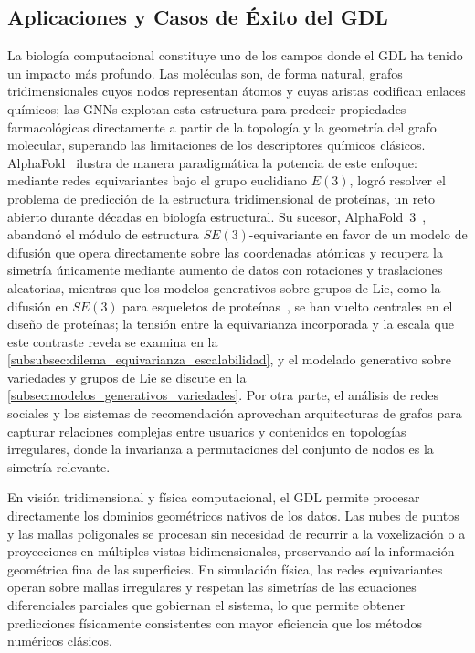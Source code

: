 \subsection{Aplicaciones y Casos de Éxito del GDL}\label{subsec:casos_exito_gdl}

La biología computacional constituye uno de los campos donde el \gls{GDL} ha tenido un impacto más profundo. Las moléculas son, de forma natural, grafos tridimensionales cuyos nodos representan átomos y cuyas aristas codifican enlaces químicos; las \glspl{GNN} explotan esta estructura para predecir propiedades farmacológicas directamente a partir de la topología y la geometría del grafo molecular, superando las limitaciones de los descriptores químicos clásicos. AlphaFold~\citep{jumper2021alphafold} ilustra de manera paradigmática la potencia de este enfoque: mediante redes equivariantes bajo el grupo euclidiano $E(3)$, logró resolver el problema de predicción de la estructura tridimensional de proteínas, un reto abierto durante décadas en biología estructural. Su sucesor, AlphaFold~3~\citep{abramson2024alphafold3}, abandonó el módulo de estructura $SE(3)$-equivariante en favor de un modelo de difusión que opera directamente sobre las coordenadas atómicas y recupera la simetría únicamente mediante aumento de datos con rotaciones y traslaciones aleatorias, mientras que los modelos generativos sobre grupos de Lie, como la difusión en $SE(3)$ para esqueletos de proteínas~\citep{yim2023se3diffusion}, se han vuelto centrales en el diseño de proteínas; la tensión entre la equivarianza incorporada y la escala que este contraste revela se examina en la \autoref{subsubsec:dilema_equivarianza_escalabilidad}, y el modelado generativo sobre variedades y grupos de Lie se discute en la \autoref{subsec:modelos_generativos_variedades}. Por otra parte, el análisis de redes sociales y los sistemas de recomendación aprovechan arquitecturas de grafos para capturar relaciones complejas entre usuarios y contenidos en topologías irregulares, donde la invarianza a permutaciones del conjunto de nodos es la simetría relevante.

En visión tridimensional y física computacional, el \gls{GDL} permite procesar directamente los dominios geométricos nativos de los datos. Las nubes de puntos y las mallas poligonales se procesan sin necesidad de recurrir a la voxelización o a proyecciones en múltiples vistas bidimensionales, preservando así la información geométrica fina de las superficies. En simulación física, las redes equivariantes operan sobre mallas irregulares y respetan las simetrías de las ecuaciones diferenciales parciales que gobiernan el sistema, lo que permite obtener predicciones físicamente consistentes con mayor eficiencia que los métodos numéricos clásicos.

